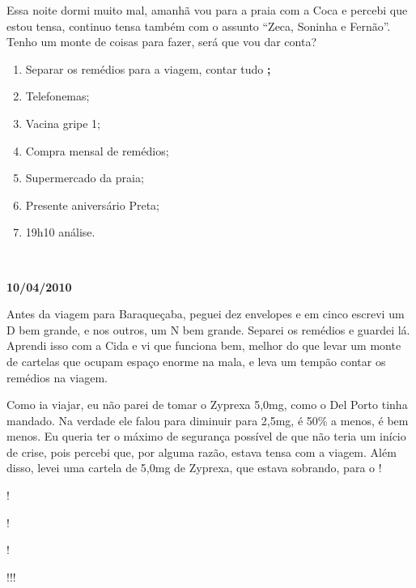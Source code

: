 Essa noite dormi muito mal, amanhã vou para a praia com a Coca e percebi
que estou tensa, continuo tensa também com o assunto ``Zeca, Soninha e
Fernão''. Tenho um monte de coisas para fazer, será que vou dar conta?

\begin{enumerate}
\item
  Separar os remédios para a viagem, contar tudo  
  \textbf{;}
\item
  Telefonemas;
\item
  Vacina gripe 1;
\item
  Compra mensal de remédios;
\item
  Supermercado da praia;
\item
  Presente aniversário Preta;
\item
  19h10 análise.
\end{enumerate}
\begin{center}​​\asterisc{}\end{center}

 \begin{flushright}\textbf{}\end{flushright}

\begin{flushright}\textbf{10/04/2010}\end{flushright}


Antes da viagem para Baraqueçaba, peguei dez envelopes e em cinco
escrevi um D bem grande, e nos outros, um N bem grande. Separei os
remédios e guardei lá. Aprendi isso com a Cida e vi que funciona bem,
melhor do que levar um monte de cartelas que ocupam espaço enorme na
mala, e leva um tempão contar os remédios na viagem.

Como ia viajar, eu não parei de tomar o Zyprexa 5,0mg, como o Del Porto
tinha mandado. Na verdade ele falou para diminuir para 2,5mg, é 50\% a
menos, é bem menos. Eu queria ter o máximo de segurança possível de que
não teria um início de crise, pois percebi que, por alguma razão, estava
tensa com a viagem. Além disso, levei uma cartela de 5,0mg de Zyprexa,
que estava sobrando, para o     !

 !

 !

     !

!!!

